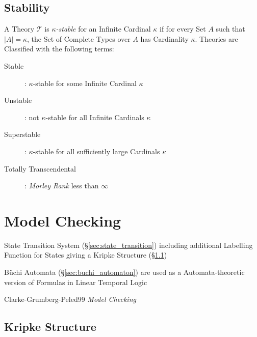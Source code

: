 \subsection{Stability}\label{sec:model_stability}

A Theory $\mathcal{T}$ is \emph{$\kappa$-stable} for an Infinite
Cardinal $\kappa$ if for every Set $A$ such that $|A| = \kappa$, the
Set of Complete Types over $A$ has Cardinality $\kappa$. Theories are
Classified with the following terms:
\begin{description}
\item [Stable]: $\kappa$-stable for some Infinite Cardinal $\kappa$
\item [Unstable]: not $\kappa$-stable for all Infinite Cardinals
  $\kappa$
\item [Superstable]: $\kappa$-stable for all sufficiently large
  Cardinals $\kappa$
\item [Totally Transcendental]: \emph{Morley Rank}\cite{morley65} less
  than $\infty$
\end{description}



\section{Model Checking}\label{sec:model_checking}

State Transition System (\S\ref{sec:state_transition}) including
additional Labelling Function for States giving a Kripke Structure
(\S\ref{sec:kripke_structure})

B\"uchi Automata (\S\ref{sec:buchi_automaton}) are used as a
Automata-theoretic version of Formulas in Linear Temporal Logic

Clarke-Grumberg-Peled99 \emph{Model Checking}



\subsection{Kripke Structure}\label{sec:kripke_structure}

